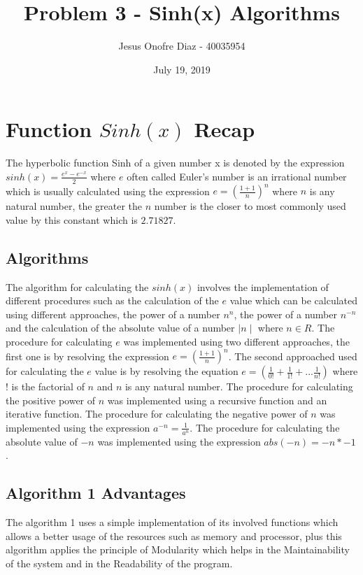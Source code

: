 \documentclass[12pt]{article}
\title{Problem 3 - Sinh(x) Algorithms }
\author{Jesus Onofre Diaz - 40035954}
\date{July 19, 2019}
\begin{document}
\maketitle
\section{Function $Sinh(x)$ Recap}
\noindent The hyperbolic function Sinh of a given number x is denoted by the expression $sinh(x)= \frac{e^x- e^{-x}}{2}$ where $e$ often called Euler's number is an irrational number which is usually calculated using the expression $e= (\frac{1+1}{n})^n$ where $n$ is any natural number, the greater the $n$ number is the closer to most commonly used value by this constant which is $2.71827$.   \\
\noindent
\subsection{Algorithms}
The algorithm for calculating the $sinh(x)$ involves the implementation of different procedures such as the calculation of the $e$ value which can be calculated using different approaches, the power of a number $n^n$, the power of a number $n^{-n}$ and the calculation of the absolute value of a number $\mid n \mid$ where $n \in {R}$. 
\noindent
\newline
The procedure for calculating $e$ was implemented using two different approaches, the first one is by resolving the expression $e= (\frac{1+1}{n})^n$. The second approached used for calculating the $e$ value is by resolving the equation $e= (\frac{1}{0!} + \frac{1}{1!}+...\frac{1}{n!})$ where $!$ is the factorial of $n$ and $n$ is any natural number. 
\newline
\newline
The procedure for calculating the positive power of $n$ was implemented using a recursive function and an iterative function.
\newline
The procedure for calculating the negative power of $n$ was implemented using the expression $a^{-n} = \frac{1}{a^n}$.
\newline
The procedure for calculating the absolute value of $-n$ was implemented using the expression $abs(-n) = -n*-1$.

\subsection{Algorithm 1 Advantages}
The algorithm 1 uses a simple implementation of its involved functions which allows a better usage of the resources such as memory and processor, plus this algorithm applies the principle of Modularity which helps in the Maintainability of the system and in the Readability of the program.  
\end{document}
